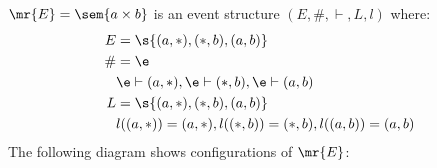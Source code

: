 \begin{example}
    $\mr{E} = \sem{a \times b}$ is an event structure
    $(E,\#,\vdash,L,l)$ where:
    \begin{align*}
        E  & = \s{(a,*),(*,b),(a,b)}                           \\
        \# & = \e                                              \\
           & \e \vdash (a,*), \e \vdash (*,b),\e \vdash (a,b)  \\
        L  & = \s{(a,*),(*,b),(a,b)}                           \\
           & l((a,*)) = (a,*), l((*,b)) = (*,b),l((a,b))=(a,b) 
    \end{align*}
    The following diagram shows configurations of $\mr{E}$:
    \begin{center}
    \end{center}
\end{example}